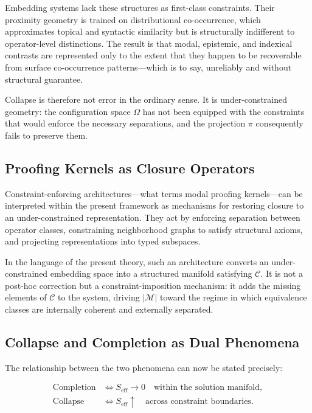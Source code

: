 \documentclass[11pt, twoside]{article}
\theoremstyle{plain}
\theoremstyle{definition}
\theoremstyle{remark}
\newcommand{\Seff}{S_{\text{eff}}}
\begin{document}
Embedding systems lack these structures as first-class constraints. Their proximity geometry is trained on distributional co-occurrence, which approximates topical and syntactic similarity but is structurally indifferent to operator-level distinctions. The result is that modal, epistemic, and indexical contrasts are represented only to the extent that they happen to be recoverable from surface co-occurrence patterns---which is to say, unreliably and without structural guarantee.

Collapse is therefore not error in the ordinary sense. It is under-constrained geometry: the configuration space $\Omega$ has not been equipped with the constraints that would enforce the necessary separations, and the projection $\pi$ consequently fails to preserve them.

\subsection{Proofing Kernels as Closure Operators}

Constraint-enforcing architectures---what \cite{denham2025collapse} terms modal proofing kernels---can be interpreted within the present framework as mechanisms for restoring closure to an under-constrained representation. They act by enforcing separation between operator classes, constraining neighborhood graphs to satisfy structural axioms, and projecting representations into typed subspaces.

In the language of the present theory, such an architecture converts an under-constrained embedding space into a structured manifold satisfying $\mathcal{C}$. It is not a post-hoc correction but a constraint-imposition mechanism: it adds the missing elements of $\mathcal{C}$ to the system, driving $|\mathcal{M}|$ toward the regime in which equivalence classes are internally coherent and externally separated.

\subsection{Collapse and Completion as Dual Phenomena}

The relationship between the two phenomena can now be stated precisely:

\begin{align*}
\text{Completion} &\iff \Seff \to 0 \quad \text{within the solution manifold}, \\
\text{Collapse} &\iff \Seff \uparrow \quad \text{across constraint boundaries}.
\end{align*}
\end{document}
